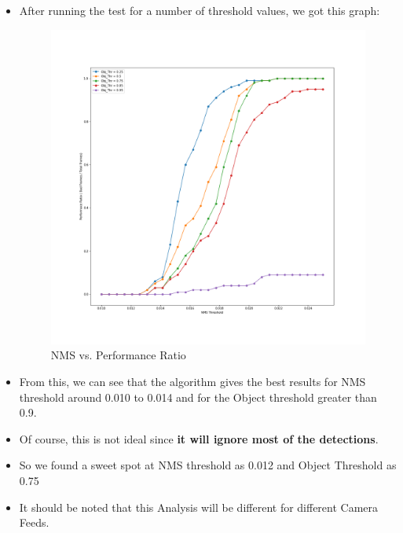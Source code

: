 \documentclass[a4paper]{article}
\begin{document}
\begin{enumerate}
\begin{itemize}
        
        \pagebreak
        \item After running the test for a number of threshold values, we got this graph:
        \begin{figure}[h]
            \centering
            \includegraphics[width=\linewidth]{Pictures/NMS vs Performance.png}
            \caption{NMS vs. Performance Ratio}
            \label{fig:NMSvsPerf}
        \end{figure}
        \item From this, we can see that the algorithm gives the best results for NMS threshold around 0.010 to 0.014 and for the Object threshold greater than 0.9.
        \item Of course, this is not ideal since \textbf{it will ignore most of the detections}.
        \item So we found a sweet spot at NMS threshold as 0.012 and Object Threshold as 0.75
        \item It should be noted that this Analysis will be different for different Camera Feeds.
    \end{itemize}
\end{enumerate}

\pagebreak
\end{document}
